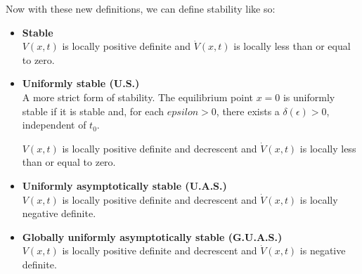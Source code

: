 {Now with these new definitions, we can define stability like so:
\begin{itemize}
    \setlength\itemsep{2em}
    \item \textbf{Stable}\\
    $V(x,t)$ is locally positive definite and $\dot{V}(x,t)$ is locally less than or equal to zero.
    
    \item \textbf{Uniformly stable (U.S.)}\\
    A more strict form of stability. The equilibrium point $x=0$ is uniformly stable if it is stable and, for each $epsilon>0$, there exists a $\delta(\epsilon)>0$, independent of $t_0$.
    
    $V(x,t)$ is locally positive definite and decrescent and $\dot{V}(x,t)$ is locally less than or equal to zero.
    
    \item \textbf{Uniformly asymptotically stable (U.A.S.)}\\
    $V(x,t)$ is locally positive definite and decrescent and $\dot{V}(x,t)$ is locally negative definite.
    
    \item \textbf{Globally uniformly asymptotically stable (G.U.A.S.)}\\
    $V(x,t)$ is locally positive definite and decrescent and $\dot{V}(x,t)$ is negative definite.
\end{itemize}
}
    
